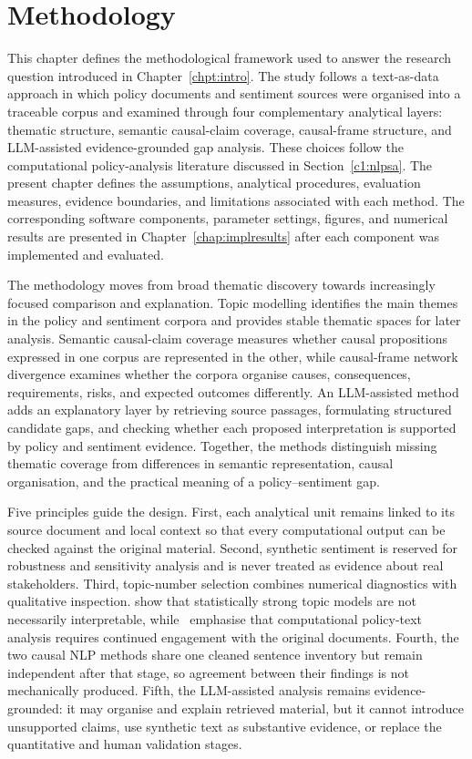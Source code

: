\chapter{Methodology}
\label{chap:method}
\graphicspath{{Chapter2/img/}}
\setlength{\emergencystretch}{2em}

This chapter defines the methodological framework used to answer the research
question introduced in Chapter~\ref{chpt:intro}. The study follows a text-as-data
approach in which policy documents and sentiment sources were organised into a
traceable corpus and examined through four complementary analytical layers: thematic
structure, semantic causal-claim coverage, causal-frame structure, and LLM-assisted
evidence-grounded gap analysis. These choices follow the computational
policy-analysis literature discussed in Section~\ref{c1:nlpsa}. The present chapter
defines the assumptions, analytical procedures, evaluation measures, evidence
boundaries, and limitations associated with each method. The corresponding software
components, parameter settings, figures, and numerical results are presented in
Chapter~\ref{chap:implresults} after each component was implemented and evaluated.

The methodology moves from broad thematic discovery towards increasingly focused
comparison and explanation. Topic modelling identifies the main themes in the policy
and sentiment corpora and provides stable thematic spaces for later analysis.
Semantic causal-claim coverage measures whether causal propositions expressed in one
corpus are represented in the other, while causal-frame network divergence examines
whether the corpora organise causes, consequences, requirements, risks, and expected
outcomes differently. An LLM-assisted method adds an explanatory layer by retrieving
source passages, formulating structured candidate gaps, and checking whether each
proposed interpretation is supported by policy and sentiment evidence. Together, the
methods distinguish missing thematic coverage from differences in semantic
representation, causal organisation, and the practical meaning of a policy--sentiment
gap.

Five principles guide the design. First, each analytical unit remains linked to its
source document and local context so that every computational output can be checked
against the original material. Second, synthetic sentiment is reserved for robustness
and sensitivity analysis and is never treated as evidence about real stakeholders.
Third, topic-number selection combines numerical diagnostics with qualitative
inspection. \cite{chang2009reading} show that statistically strong topic models are
not necessarily interpretable, while~\cite{isoaho2021topic} emphasise that
computational policy-text analysis requires continued engagement with the original
documents. Fourth, the two causal NLP methods share one cleaned sentence inventory
but remain independent after that stage, so agreement between their findings is not
mechanically produced. Fifth, the LLM-assisted analysis remains evidence-grounded: it
may organise and explain retrieved material, but it cannot introduce unsupported
claims, use synthetic text as substantive evidence, or replace the quantitative and
human validation stages.


